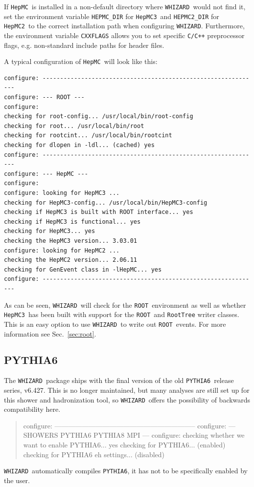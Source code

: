 \documentclass[12pt]{book}
\newcommand{\ttt}[1]{\texttt{#1}}
\newcommand{\whizard}{\ttt{WHIZARD}}
\newcommand{\pythiasix}{\ttt{PYTHIA6}}
\newcommand{\hepmc}{\ttt{HepMC}}
\newcommand{\hepmctwo}{\ttt{HepMC2}}
\newcommand{\hepmcthree}{\ttt{HepMC3}}
\newcommand{\ROOT}{\ttt{ROOT}}
\begin{document}
If \hepmc\ is installed in a non-default directory where \whizard\
would not find it, set the environment variable \ttt{HEPMC\_DIR} for
\hepmcthree\ and \ttt{HEPMC2\_DIR} for \hepmctwo\ to
the correct installation path when configuring \whizard.  Furthermore,
the environment variable \ttt{CXXFLAGS} allows you to set specific
\ttt{C/C++} preprocessor flags, e.g. non-standard include paths for
header files.

A typical configuration of \hepmc\ will look like this:
\begin{footnotesize}
\begin{verbatim}
configure: --------------------------------------------------------------
configure: --- ROOT ---
configure:
checking for root-config... /usr/local/bin/root-config
checking for root... /usr/local/bin/root
checking for rootcint... /usr/local/bin/rootcint
checking for dlopen in -ldl... (cached) yes
configure: --------------------------------------------------------------
configure: --- HepMC ---
configure: 
configure: looking for HepMC3 ... 
checking for HepMC3-config... /usr/local/bin/HepMC3-config
checking if HepMC3 is built with ROOT interface... yes
checking if HepMC3 is functional... yes
checking for HepMC3... yes
checking the HepMC3 version... 3.03.01
configure: looking for HepMC2 ... 
checking the HepMC2 version... 2.06.11
checking for GenEvent class in -lHepMC... yes
configure: --------------------------------------------------------------
\end{verbatim}
\end{footnotesize}
As can be seen, \whizard\ will check for the \ROOT\ environment as
well as whether \hepmcthree\ has been built with support for the
\ROOT\ and \ttt{RootTree} writer classes. This is an easy option to
use \whizard\ to write out \ROOT\ events. For more information see
Sec.~\ref{sec:root}.


\subsection{PYTHIA6}
\label{sec:pythia6_conf}

The \whizard\ package ships with the final version of the old
\pythiasix\ release series, v6.427. This is no longer maintained, but
many analyses are still set up for this shower and hadronization tool,
so \whizard\ offers the possibility of backwards compatibility here.
\begin{quote}
configure: --------------------------------------------------------------
configure: --- SHOWERS PYTHIA6 PYTHIA8 MPI ---
configure:
checking whether we want to enable PYTHIA6... yes
checking for PYTHIA6... (enabled)
checking for PYTHIA6 eh settings... (disabled)
\end{quote}
\whizard\ automatically compiles \pythiasix, it has not to be
specifically enabled by the user.
\end{document}

